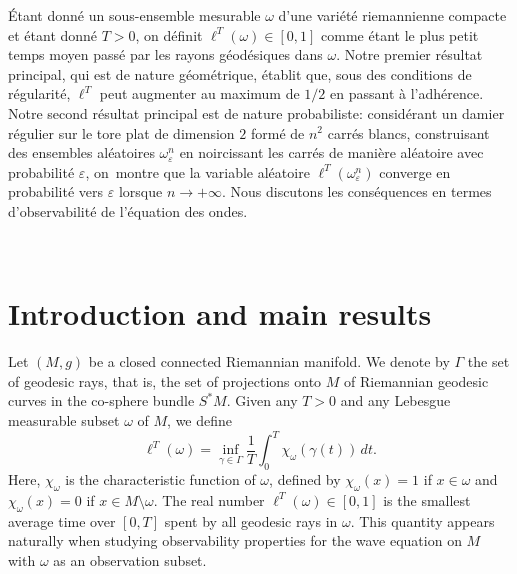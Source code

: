 \documentclass[JEP,XML,SOM,Unicode, NoEqCountersInSection,NoFloatCountersInSection,published]{cedram}
\theoremstyle{definition}
\begin{document}
\begin{altabstract}
Étant donné un sous-ensemble mesurable $\omega$ d'une variété riemannienne compacte et étant donné $T>0$, on définit $\ell^T(\omega)\in[0,1]$ comme étant le plus petit temps moyen passé par les rayons géodésiques dans $\omega$. Notre premier résultat principal, qui est de nature géométrique, établit que, sous des conditions de régularité, $\ell^T$ peut augmenter au maximum de $1/2$ en passant à l'adhérence. Notre second résultat principal est de nature probabiliste: considérant un damier régulier sur le tore plat de dimension $2$ formé de $n^2$ carrés blancs, construisant des ensembles aléatoires $\omega_\varepsilon^n$ en noircissant les carrés de manière aléatoire avec probabilité $\varepsilon$, on~montre que la variable aléatoire $\ell^T(\omega_\varepsilon^n)$ converge en probabilité vers $\varepsilon$ lorsque $n\rightarrow+\infty$. Nous discutons les conséquences en termes d'observabilité de l'équation des ondes.
\end{altabstract}




\maketitle
\vspace*{-\baselineskip}\enlargethispage{\baselineskip}%
\tableofcontents
\mainmatter

\vspace*{-3.5\baselineskip}\mbox{ }
\section{Introduction and main results}\label{sec1}
Let $(M,g)$ be a closed connected Riemannian manifold.
We denote by $\Gamma$ the set of geodesic rays, that is, the set of projections onto $M$ of Riemannian geodesic curves in the co-sphere bundle $S^*M$.
Given any $T>0$ and any Lebesgue measurable subset $\omega$ of $M$, we define\vspace*{-3pt}
\begin{equation}\label{defg2}
\ell^T(\omega) = \inf_{\gamma\in\Gamma} \frac{1}{T} \int_0^T \chi_\omega(\gamma(t)) \, dt.
\end{equation}
Here, $\chi_\omega$ is the characteristic function of $\omega$, defined by $\chi_\omega(x)=1$ if $x\in\omega$ and $\chi_\omega(x)=0$ if $x\in M\setminus\omega$.
The real number $\ell^T(\omega)\in[0,1]$ is the smallest average time over $[0,T]$ spent by all geodesic rays in $\omega$.
This quantity appears naturally when studying observability properties for the wave equation on $M$ with $\omega$ as an observation subset.
\end{document}
